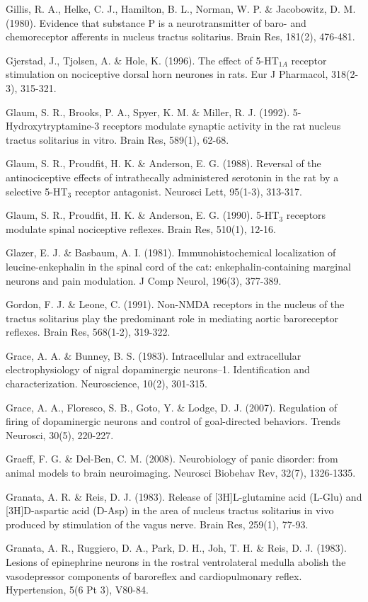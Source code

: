 \documentclass[a4paper,12pt,twoside]{report}
\begin{document}
\begin{singlespacing}
\begin{footnotesize}
Gillis, R. A., Helke, C. J., Hamilton, B. L., Norman, W. P. \& Jacobowitz, D. M. (1980). Evidence that substance P is a neurotransmitter of baro- and chemoreceptor afferents in nucleus tractus solitarius. Brain Res, 181(2), 476-481.

Gjerstad, J., Tjolsen, A. \& Hole, K. (1996). The effect of 5-HT$_{1A}$ receptor stimulation on nociceptive dorsal horn neurones in rats. Eur J Pharmacol, 318(2-3), 315-321.

Glaum, S. R., Brooks, P. A., Spyer, K. M. \& Miller, R. J. (1992). 5-Hydroxytryptamine-3 receptors modulate synaptic activity in the rat nucleus tractus solitarius in vitro. Brain Res, 589(1), 62-68.

Glaum, S. R., Proudfit, H. K. \& Anderson, E. G. (1988). Reversal of the antinociceptive effects of intrathecally administered serotonin in the rat by a selective 5-HT$_{3}$ receptor antagonist. Neurosci Lett, 95(1-3), 313-317.

Glaum, S. R., Proudfit, H. K. \& Anderson, E. G. (1990). 5-HT$_{3}$ receptors modulate spinal nociceptive reflexes. Brain Res, 510(1), 12-16.

Glazer, E. J. \& Basbaum, A. I. (1981). Immunohistochemical localization of leucine-enkephalin in the spinal cord of the cat: enkephalin-containing marginal neurons and pain modulation. J Comp Neurol, 196(3), 377-389.

Gordon, F. J. \& Leone, C. (1991). Non-NMDA receptors in the nucleus of the tractus solitarius play the predominant role in mediating aortic baroreceptor reflexes. Brain Res, 568(1-2), 319-322.

Grace, A. A. \& Bunney, B. S. (1983). Intracellular and extracellular electrophysiology of nigral dopaminergic neurons--1. Identification and characterization. Neuroscience, 10(2), 301-315.

Grace, A. A., Floresco, S. B., Goto, Y. \& Lodge, D. J. (2007). Regulation of firing of dopaminergic neurons and control of goal-directed behaviors. Trends Neurosci, 30(5), 220-227.

Graeff, F. G. \& Del-Ben, C. M. (2008). Neurobiology of panic disorder: from animal models to brain neuroimaging. Neurosci Biobehav Rev, 32(7), 1326-1335.

Granata, A. R. \& Reis, D. J. (1983). Release of [3H]L-glutamine acid (L-Glu) and [3H]D-aspartic acid (D-Asp) in the area of nucleus tractus solitarius in vivo produced by stimulation of the vagus nerve. Brain Res, 259(1), 77-93.

Granata, A. R., Ruggiero, D. A., Park, D. H., Joh, T. H. \& Reis, D. J. (1983). Lesions of epinephrine neurons in the rostral ventrolateral medulla abolish the vasodepressor components of baroreflex and cardiopulmonary reflex. Hypertension, 5(6 Pt 3), V80-84.


\end{footnotesize}
\end{singlespacing}
\end{document}
